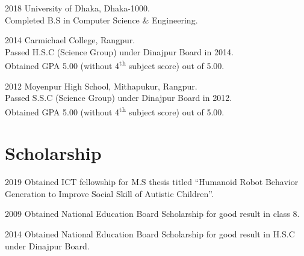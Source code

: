 \documentclass[a4paper,12pt]{article}
\begin{document}
\begin{CV}
\item[2018] University of Dhaka, Dhaka-1000.\\Completed B.S in Computer Science \& Engineering.
\item[2014] Carmichael College, Rangpur.\\Passed H.S.C (Science Group) under Dinajpur Board in 2014.\\Obtained GPA 5.00 (without 4\textsuperscript{th} subject score) out of 5.00.
\item[2012] Moyenpur High School, Mithapukur, Rangpur.\\Passed S.S.C (Science Group) under Dinajpur Board in 2012.\\Obtained GPA 5.00 (without 4\textsuperscript{th} subject score) out of 5.00.
\end{CV}






\section{Scholarship}

\begin{CV}
\item[2019] Obtained ICT fellowship for M.S thesis titled “Humanoid Robot Behavior Generation to Improve Social Skill of Autistic Children”.
\item[2009] Obtained National Education Board Scholarship for good result in class 8.
\item[2014] Obtained National Education Board Scholarship for good result in H.S.C under Dinajpur Board.
\end{CV}
\end{document}
